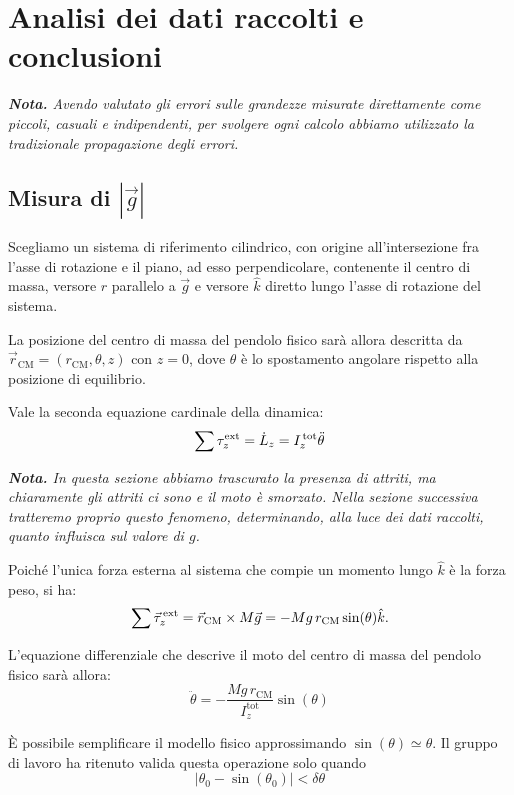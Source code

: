 \documentclass{article}
\begin{document}
\section{Analisi dei dati raccolti e conclusioni}
\emph{\textbf{Nota.}
Avendo valutato gli errori sulle grandezze misurate direttamente
come piccoli, casuali e indipendenti, per svolgere ogni calcolo
abbiamo utilizzato la tradizionale propagazione degli errori.
}

\subsection{Misura di $\left|\vec{g}\right|$}

Scegliamo un sistema di riferimento cilindrico, con
origine all'intersezione fra l'asse di rotazione e il piano,
ad esso perpendicolare, contenente il centro di massa, versore $\hat{r}$
parallelo a $\vec{g}$ e versore $\hat{k}$ diretto lungo l'asse di
rotazione del sistema.

La posizione del centro di massa del pendolo fisico sarà allora descritta
da $\vec{r}_\text{CM} = (r_\text{CM},\theta,z)$ con $z=0$, dove $\theta$
è lo spostamento angolare rispetto alla posizione di equilibrio.

Vale la seconda equazione cardinale della dinamica:
\[\sum\tau^\text{ext}_z = \dot{L}_z = I_z^\text{\,tot} \ddot{\theta}\]

\vspace{2mm}
\emph{
  \textbf{Nota.} In questa sezione abbiamo trascurato la presenza di
  attriti, ma chiaramente gli attriti ci sono e il moto è smorzato.
  Nella sezione successiva tratteremo proprio questo fenomeno,
  determinando, alla luce dei dati raccolti, quanto influisca
  sul valore di $g$.
}
\vspace{2mm}

Poiché l'unica forza esterna al sistema che compie un momento lungo
$\hat{k}$ è la forza peso, si ha:
\[
  \sum\vec{\tau}^\text{\,ext}_z =
  \vec{r}_\text{CM}\times M\vec{g} = -Mg\,r_\text{CM}\sin(\theta)\hat{k}.
\]

L'equazione differenziale che descrive il moto del centro di massa
del pendolo fisico sarà allora:
\[ \ddot{\theta} = -\frac{Mg\,r_\text{CM}}{I_z^\text{tot}}\sin(\theta) \]

È possibile semplificare il modello fisico approssimando
$\sin(\theta)\simeq\theta$. Il gruppo di lavoro ha ritenuto
valida questa operazione solo quando
\[\left|\theta_0-\sin(\theta_0)\right| < \delta\theta\]
\end{document}
